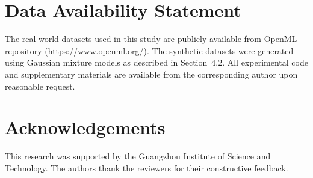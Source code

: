 \documentclass[12pt,a4paper]{article}
\theoremstyle{definition}
\begin{document}
\section*{Data Availability Statement}
\indent The real-world datasets used in this study are publicly available from OpenML repository (\url{https://www.openml.org/}). The synthetic datasets were generated using Gaussian mixture models as described in Section~4.2. All experimental code and supplementary materials are available from the corresponding author upon reasonable request.

\section*{Acknowledgements}
\indent This research was supported by the Guangzhou Institute of Science and Technology. The authors thank the reviewers for their constructive feedback.
\end{document}
